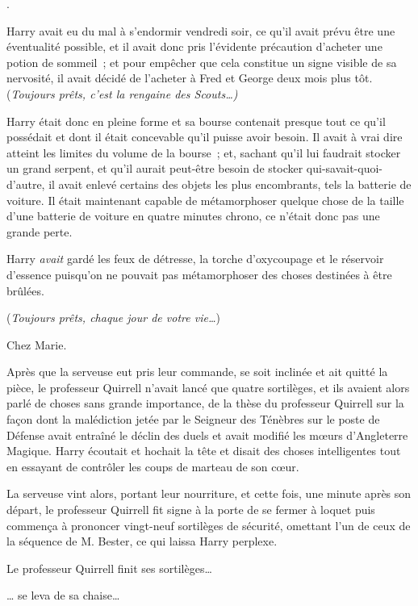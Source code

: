 
.

\hplettrineextrapara
Harry avait eu du mal à s'endormir vendredi soir, ce qu'il avait prévu être une éventualité possible, et il avait donc pris l'évidente précaution d'acheter une potion de sommeil~; et pour empêcher que cela constitue un signe visible de sa nervosité, il avait décidé de l'acheter à Fred et George deux mois plus tôt. (\emph{Toujours prêts, c'est la rengaine des Scouts…)}

Harry était donc en pleine forme et sa bourse contenait presque tout ce qu'il possédait et dont il était concevable qu'il puisse avoir besoin. Il avait à vrai dire atteint les limites du volume de la bourse~; et, sachant qu'il lui faudrait stocker un grand serpent, et qu'il aurait peut-être besoin de stocker qui-savait-quoi-d'autre, il avait enlevé certains des objets les plus encombrants, tels la batterie de voiture. Il était maintenant capable de métamorphoser quelque chose de la taille d'une batterie de voiture en quatre minutes chrono, ce n'était donc pas une grande perte.

Harry \emph{avait} gardé les feux de détresse, la torche d'oxycoupage et le réservoir d'essence puisqu'on ne pouvait pas métamorphoser des choses destinées à être brûlées.

(\emph{Toujours prêts, chaque jour de votre vie…})

Chez Marie.

Après que la serveuse eut pris leur commande, se soit inclinée et ait quitté la pièce, le professeur Quirrell n'avait lancé que quatre sortilèges, et ils avaient alors parlé de choses sans grande importance, de la thèse du professeur Quirrell sur la façon dont la malédiction jetée par le Seigneur des Ténèbres sur le poste de Défense avait entraîné le déclin des duels et avait modifié les mœurs d'Angleterre Magique. Harry écoutait et hochait la tête et disait des choses intelligentes tout en essayant de contrôler les coups de marteau de son cœur.

La serveuse vint alors, portant leur nourriture, et cette fois, une minute après son départ, le professeur Quirrell fit signe à la porte de se fermer à loquet puis commença à prononcer vingt-neuf sortilèges de sécurité, omettant l'un de ceux de la séquence de M. Bester, ce qui laissa Harry perplexe.

Le professeur Quirrell finit ses sortilèges…

… se leva de sa chaise…


